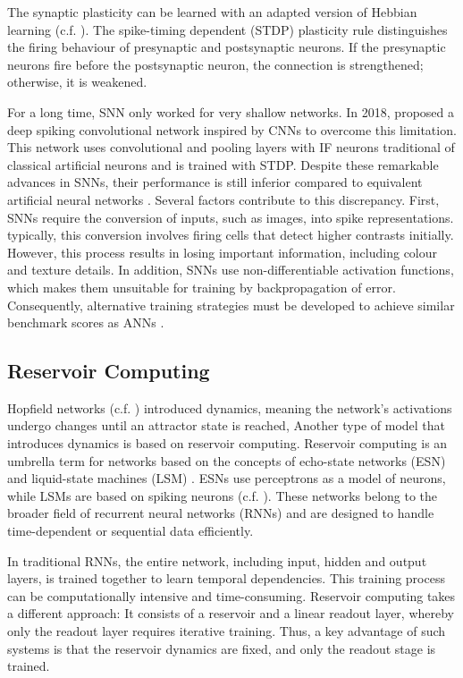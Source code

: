 The synaptic plasticity can be learned with an adapted version of Hebbian learning (c.f. ).
The spike-timing dependent (STDP) plasticity rule  distinguishes the firing behaviour of presynaptic and postsynaptic neurons.
If the presynaptic neurons fire before the postsynaptic neuron, the connection is strengthened; otherwise, it is weakened.

For a long time, SNN only worked for very shallow networks.
In 2018,  proposed a deep spiking convolutional network inspired by CNNs to overcome this limitation.
This network uses convolutional and pooling layers with IF neurons traditional of classical artificial neurons and is trained with STDP.
Despite these remarkable advances in SNNs, their performance is still inferior compared to equivalent artificial neural networks . Several factors contribute to this discrepancy. First, SNNs require the conversion of inputs, such as images, into spike representations.
typically, this conversion involves firing cells that detect higher contrasts initially. 
However, this process results in losing important information, including colour and texture details. In addition, SNNs use non-differentiable activation functions, which makes them unsuitable for training by backpropagation of error. Consequently, alternative training strategies must be developed to achieve similar benchmark scores as ANNs \cite{nunes_spiking_2022}.


\subsection{Reservoir Computing}
Hopfield networks (c.f. ) introduced dynamics, meaning the network's activations undergo changes until an attractor state is reached,
Another type of model that introduces dynamics is based on reservoir computing.
Reservoir computing is an umbrella term for networks based on the concepts of echo-state networks (ESN)  and liquid-state machines (LSM) .
ESNs use perceptrons as a model of neurons, while LSMs are based on spiking neurons (c.f. ).
These networks belong to the broader field of recurrent neural networks (RNNs) \cite{} and are designed to handle time-dependent or sequential data efficiently.

In traditional RNNs, the entire network, including input, hidden and output layers, is trained together to learn temporal dependencies. This training process can be computationally intensive and time-consuming. Reservoir computing takes a different approach: It consists of a reservoir and a linear readout layer, whereby only the readout layer requires iterative training.
Thus, a key advantage of such systems is that the reservoir dynamics are fixed, and only the readout stage is trained.

